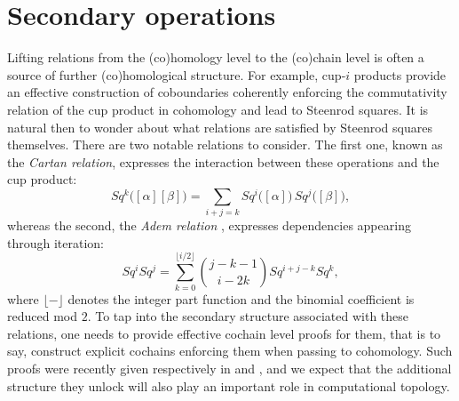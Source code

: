 
\section{Secondary operations} \label{s:outlook}

Lifting relations from the (co)homology level to the (co)chain level is often a source of further (co)homological structure.
For example, cup-$i$ products provide an effective construction of coboundaries coherently enforcing the commutativity relation of the cup product in cohomology and lead to Steenrod squares.
It is natural then to wonder about what relations are satisfied by Steenrod squares themselves.
There are two notable relations to consider.
The first one, known as the \textit{Cartan relation}, expresses the interaction between these operations and the cup product:
\begin{equation*}
Sq^k \big( [\alpha] [\beta] \big) = \sum_{i+j=k} Sq^i \big([\alpha]\big)\, Sq^j \big([\beta]\big),
\end{equation*}
whereas the second, the \textit{Adem relation} \cite{adem1952iteration}, expresses dependencies appearing through iteration:
\begin{equation*}
Sq^i Sq^j = \sum_{k=0}^{\lfloor i/2 \rfloor} \binom{j-k-1}{i-2k} Sq^{i+j-k} Sq^k,
\end{equation*}
where $\lfloor- \rfloor$ denotes the integer part function and the binomial coefficient is reduced mod $2$.
To tap into the secondary structure associated with these relations, one needs to provide effective cochain level proofs for them, that is to say, construct explicit cochains enforcing them when passing to cohomology.
Such proofs were recently given respectively in \cite{medina2020cartan} and \cite{medina2021adem}, and we expect that the additional structure they unlock will also play an important role in computational topology.